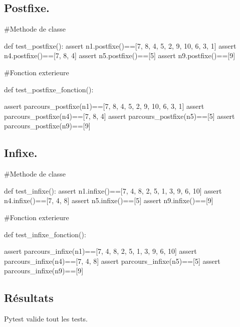\documentclass{article}
\begin{document}
\subsection{Postfixe.}

\begin{python}
    #Methode de classe

    def test_postfixe():
        assert n1.postfixe()==[7, 8, 4, 5, 2, 9, 10, 6, 3, 1]
        assert n4.postfixe()==[7, 8, 4]
        assert n5.postfixe()==[5]
        assert n9.postfixe()==[9]

    #Fonction exterieure

    def test_postfixe_fonction():
    
        assert parcours_postfixe(n1)==[7, 8, 4, 5, 2, 9, 10, 6, 3, 1]
        assert parcours_postfixe(n4)==[7, 8, 4]
        assert parcours_postfixe(n5)==[5]
        assert parcours_postfixe(n9)==[9]
    


\end{python}

\subsection{Infixe.}

\begin{python}
    #Methode de classe

    def test_infixe():
        assert n1.infixe()==[7, 4, 8, 2, 5, 1, 3, 9, 6, 10]
        assert n4.infixe()==[7, 4, 8]
        assert n5.infixe()==[5]
        assert n9.infixe()==[9]

    #Fonction exterieure

    def test_infixe_fonction():
    
        assert parcours_infixe(n1)==[7, 4, 8, 2, 5, 1, 3, 9, 6, 10]
        assert parcours_infixe(n4)==[7, 4, 8]
        assert parcours_infixe(n5)==[5]
        assert parcours_infixe(n9)==[9]
\end{python}
\subsection{Résultats}
Pytest valide tout les tests.
\end{document}
